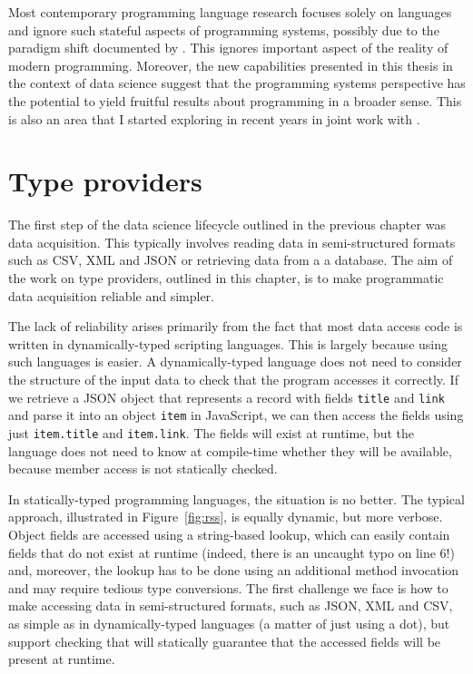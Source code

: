\documentclass[fleqn,11pt]{report}
\theoremstyle{definition}
\begin{document}
Most contemporary programming language research focuses solely on languages and
ignore such stateful aspects of programming systems, possibly due to the paradigm shift documented
by \cite{rpg-2012-revolution}. This ignores important aspect of the reality of modern programming.
Moreover, the new capabilities presented in this thesis in the context of data science suggest
that the programming systems perspective has the potential to yield fruitful results about
programming in a broader sense. This is also an area that I started exploring in recent years
in joint work with \cite{jakubovic-2023-techdims,edwards-2021-image,edwards-2025-schema}.


\chapter{Type providers}
\label{ch:tp}

The first step of the data science lifecycle outlined in the previous chapter was data acquisition.
This typically involves reading data in semi-structured formats such as CSV, XML and JSON or
retrieving data from a a database. The aim of the work on type providers, outlined in this chapter,
is to make programmatic data acquisition reliable and simpler.

The lack of reliability arises primarily from the fact that most data access code is written in
dynamically-typed scripting languages. This is largely because using such languages is easier.
A dynamically-typed language does not need to consider the structure of the input data to
check that the program accesses it correctly. If we retrieve a JSON object that represents a record
with fields \texttt{title} and \texttt{link} and parse it into an object \texttt{item} in
JavaScript, we can then access the fields using just \texttt{item.title} and \texttt{item.link}.
The fields will exist at runtime, but the language does not need to know at compile-time whether
they will be  available, because member access is not statically checked.

In statically-typed programming languages, the situation is no better. The typical approach, illustrated
in Figure~\ref{fig:rss}, is equally dynamic, but more verbose. Object fields are accessed using
a string-based lookup, which can easily contain fields that do not exist at runtime (indeed, there
is an uncaught typo on line 6!) and, moreover, the lookup has to be done using an additional method
invocation and may require tedious type conversions. The first challenge we face is how to
make accessing data in semi-structured formats, such as JSON, XML and CSV, as simple as in
dynamically-typed languages (a matter of just using a dot), but support checking that will
statically guarantee that the accessed fields will be present at runtime.
\end{document}
